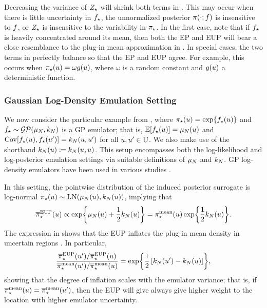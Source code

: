 \documentclass[12pt]{article}
\begin{document}
Decreasing the variance of ${Z}_{\star}$ will shrink both terms in 
. This may occur when there is little 
uncertainty in ${f}_{\star}$, the unnormalized posterior $\pi(\cdot; f)$
is insensitive to $f$, or ${Z}_{\star}$ is insensitive to the variability 
in ${\pi}_{\star}$. In the first case, note that if ${f}_{\star}$ is heavily 
concentrated around its mean, then both the EP and EUP will bear a close resemblance
to the plug-in mean approximation in .
In special cases, the two terms in  perfectly balance so that 
the EP and EUP agree. For example, this occurs when 
${\pi}_{\star}(u) = \omega g(u)$, where $\omega$ is a random constant and 
$g(u)$ a deterministic function. 

\subsubsection{Gaussian Log-Density Emulation Setting} \label{sec:ldens-Gaussian}
We now consider the particular example from ,
where ${\pi}_{\star}(u) = \exp\mathopen{}\left\{{f}_{\star}(u)\right\}\mathclose{}$
and ${f}_{\star} \sim \mathcal{GP}(\mu_{N}, k_{N})$ is a GP emulator; that is, 
$\mathbb{E}[{f}_{\star}(u)] = \mu_{N}(u)$ and 
$\mathrm{Cov}[{f}_{\star}(u),{f}_{\star}(u^\prime)] = k_{N}(u, u^\prime)$ for all 
$u, u^\prime \in \mathbb{U}$. We also make use of the shorthand 
$k_{N}(u) \coloneqq k_{N}(u, u)$. This setup encompasses both the log-likelihood
and log-posterior emulation settings via suitable definitions of $\mu_{N}$ and $k_{N}$.
GP log-density emulators have been used in various studies 
\citep{VehtariParallelGP,FATES_CES,trainDynamics,quantileApprox,ActiveLearningMCMC,FerEmulation,
StuartTeck1,random_fwd_models,GP_PDE_priors,OakleyllikEm,JosephMinEnergy,AlawiehIterativeGP}.

In this setting, the pointwise distribution of the induced posterior surrogate is log-normal
${\pi}_{\star}(u) \sim \mathrm{LN}(\mu_{N}(u), k_{N}(u))$, implying that
\begin{equation}
{\overline{\pi}}_{\star}^{\mathrm{EUP}}(u) 
\propto \exp\mathopen{}\left\{\mu_{N}(u) + \frac{1}{2}k_{N}(u)\right\}\mathclose{}
= {\pi}_{\star}^{\mathrm{mean}}(u) \exp\mathopen{}\left\{\frac{1}{2}k_{N}(u)\right\}\mathclose{}.
\label{eq:EUP-Gaussian-ldens}
\end{equation} 
The expression in  shows that the EUP inflates the plug-in mean 
density in uncertain regions \citep{StuartTeck2,GP_PDE_priors}. In particular, 
 \begin{equation}
 \frac{{\overline{\pi}}_{\star}^{\mathrm{EUP}}(u^\prime)/{\overline{\pi}}_{\star}^{\mathrm{EUP}}(u)}{{\overline{\pi}}_{\star}^{\mathrm{mean}}(u^\prime)/{\overline{\pi}}_{\star}^{\mathrm{mean}}(u)}
 = \exp\mathopen{}\left\{\frac{1}{2}\left[k_{N}(u^\prime) - k_{N}(u) \right]\right\}\mathclose{},
 \label{eq:unc-infl-factor}
 \end{equation}
showing that the degree of inflation scales with the emulator variance; that is, if 
${\overline{\pi}}_{\star}^{\mathrm{mean}}(u)={\overline{\pi}}_{\star}^{\mathrm{mean}}(u^\prime)$, then the EUP will give 
always give higher weight to the location with higher emulator uncertainty.
\end{document}
